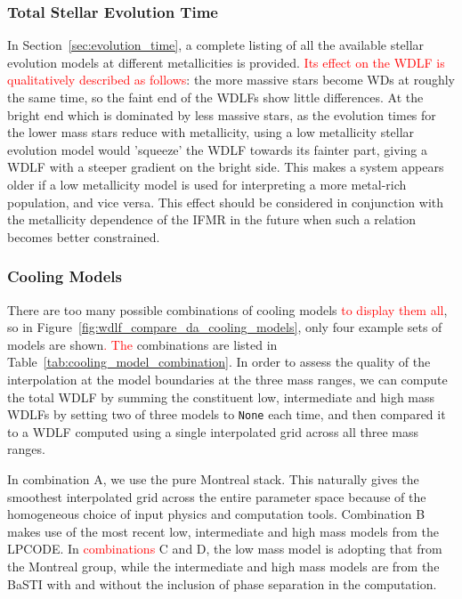 \documentclass[fleqn,usenatbib]{rasti}
\begin{document}
\subsubsection{Total Stellar Evolution Time}
In Section~\ref{sec:evolution_time}, a complete listing of all the available
stellar evolution models at different metallicities is provided. \textcolor{red}{Its effect on
the WDLF is qualitatively described as follows}: the more
massive stars become WDs at roughly the same time, so the faint end of the
WDLFs show little differences. At the bright end which is dominated by less
massive stars, as the evolution times for the lower mass stars reduce with
metallicity, using a low metallicity stellar evolution model would 'squeeze'
the WDLF towards its fainter part, giving a WDLF with a steeper gradient on
the bright side. This makes a system appears older if a low metallicity
model is used for interpreting a more metal-rich population, and vice versa.
This effect should be considered in conjunction with the metallicity
dependence of the IFMR in the future when such a relation becomes better
constrained.

\subsubsection{Cooling Models}
There are too many possible combinations of cooling models \textcolor{red}{to display them all}, so in
Figure~\ref{fig:wdlf_compare_da_cooling_models}, only four example
sets of models are shown\textcolor{red}{. The} combinations are listed in
Table~\ref{tab:cooling_model_combination}. In order to assess the quality of
the interpolation at the model boundaries at the three mass ranges, we can
compute the total WDLF by summing the constituent low, intermediate and high
mass WDLFs by setting two of three models to \texttt{None} each time, and then
compared it to a WDLF computed using a single interpolated grid across
all three mass ranges.

In combination A, we use the pure Montreal stack. This naturally gives the
smoothest interpolated grid across the entire parameter space because of the
homogeneous choice of input physics and computation tools. Combination B makes
use of the most recent low, intermediate and high mass models from the LPCODE.
In \textcolor{red}{combinations} C and D, the low mass model is adopting that from the Montreal
group, while the intermediate and high mass models are from the BaSTI with and
without the inclusion of phase separation in the computation.
\end{document}
